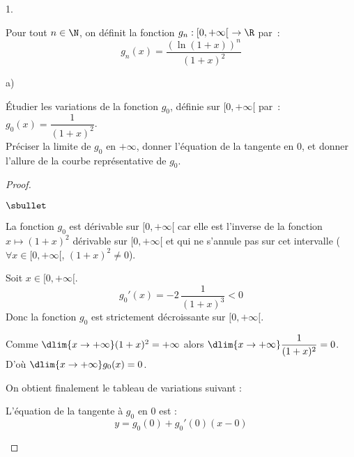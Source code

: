 \documentclass[11pt]{article}%
\begin{document}
\begin{noliste}{1.}
  \setlength{\itemsep}{2mm}
\item Pour tout $n \in \N$, on définit la fonction $g_n : [0,+\infty[
  \ \rightarrow \R$ par~:
  \[ 
  g_n(x) = \dfrac{( \ln(1+x))^n}{(1+x)^2} 
  \]

\begin{noliste}{a)}
\item Étudier les variations de la fonction $g_0$, définie sur 
$[0,+\infty[$ par~: $g_0(x) = \dfrac{1}{(1+x)^2}$.\\ 
Préciser la limite de $g_0$ en $+\infty$, donner l'équation de la 
tangente en $0$, et donner l'allure de la courbe représentative de 
$g_0$.

\begin{proof}~
 \begin{noliste}{$\sbullet$}
 \item La fonction $g_0$ est dérivable sur $[0, +\infty[$ car elle est
   l'inverse de la fonction $x \mapsto (1+x)^2$ dérivable sur $[0,
   +\infty[$ et qui ne s'annule pas sur cet intervalle ($\forall x\in
   [0,+\infty[$, $(1+x)^2 \neq 0$).
  
  \item Soit $x\in [0,+\infty[$.
  \[
   g_0'(x) = -2 \, \dfrac{1}{(1+x)^3} <0
  \]
  Donc la fonction $g_0$ est strictement décroissante sur $[0,+\infty[$.
  
  
\item Comme $\dlim{x\to+\infty} (1+x)^2=+\infty$ alors $\dlim{x\to
    +\infty} \dfrac{1}{(1+x)^2}=0$. D'où $\dlim{x\to+\infty}
  g_0(x)=0$.
  
  \item On obtient finalement le tableau de variations suivant :
  
  \begin{center}
     \end{center}
     
   \item L'équation de la tangente à $g_0$ en $0$ est :
     \[
     y = g_0(0) + g_0'(0)(x-0)
     \]
  

\end{noliste}
\end{proof}
\end{noliste}
\end{noliste}
\end{document}
